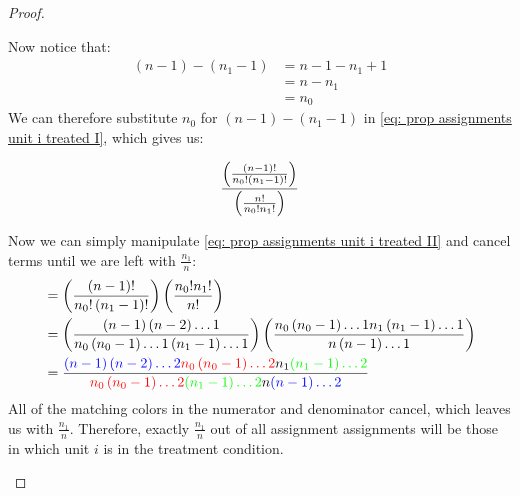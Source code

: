 \documentclass[12pt,leqno]{article}
\theoremstyle{newstyle}
\begin{document}
\begin{proof}
\begin{enumerate}
Now notice that:
\begin{align*}
\left(n - 1\right) - \left(n_1 - 1\right) & = n - 1 - n_1 + 1 \\
& = n - n_1 \\
& = n_0
\end{align*}
We can therefore substitute $n_0$ for $\left(n - 1\right) - \left(n_1 - 1\right)$ in \eqref{eq: prop assignments unit i treated I}, which gives us:

\begin{equation}\label{eq: prop assignments unit i treated II}
\frac{\left(\frac{\left(n - 1\right)!}{n_0!\left(n_1 - 1\right)!}\right)}{\left(\frac{n!}{n_0!n_1!}\right)} \\
\end{equation}

Now we can simply manipulate \eqref{eq: prop assignments unit i treated II} and cancel terms until we are left with $\frac{n_1}{n}$:
\begin{align*}
& = \left(\frac{\left(n - 1\right)!}{n_0!\left(n_1 - 1\right)!}\right)\left(\frac{n_0!n_1!}{n!}\right) \\
& = \left(\frac{\left(n - 1\right)\left(n - 2\right) \dots 1}{n_0\left(n_0 - 1\right) \dots 1 \left(n_1 - 1\right) \dots 1}\right) \left(\frac{n_0\left(n_0 - 1\right) \dots 1 n_1 \left(n_1 - 1\right) \dots 1}{n\left(n - 1\right) \dots 1}\right) \\
& = \frac{\textcolor{blue}{\left(n - 1\right)\left(n - 2\right) \dots 2} \textcolor{red}{n_0\left(n_0 - 1\right) \dots 2} n_1 \textcolor{green}{\left(n_1 - 1\right) \dots 2}}{\textcolor{red}{n_0\left(n_0 - 1\right) \dots 2} \textcolor{green}{\left(n_1 - 1\right) \dots 2} n\textcolor{blue}{\left(n - 1\right) \dots 2}} \\
\end{align*}
All of the matching colors in the numerator and denominator cancel, which leaves us with $\frac{n_1}{n}$. Therefore, exactly $\frac{n_1}{n}$ out of all assignment assignments will be those in which unit $i$ is in the treatment condition. 


\end{enumerate}
\end{proof}
\end{document}
